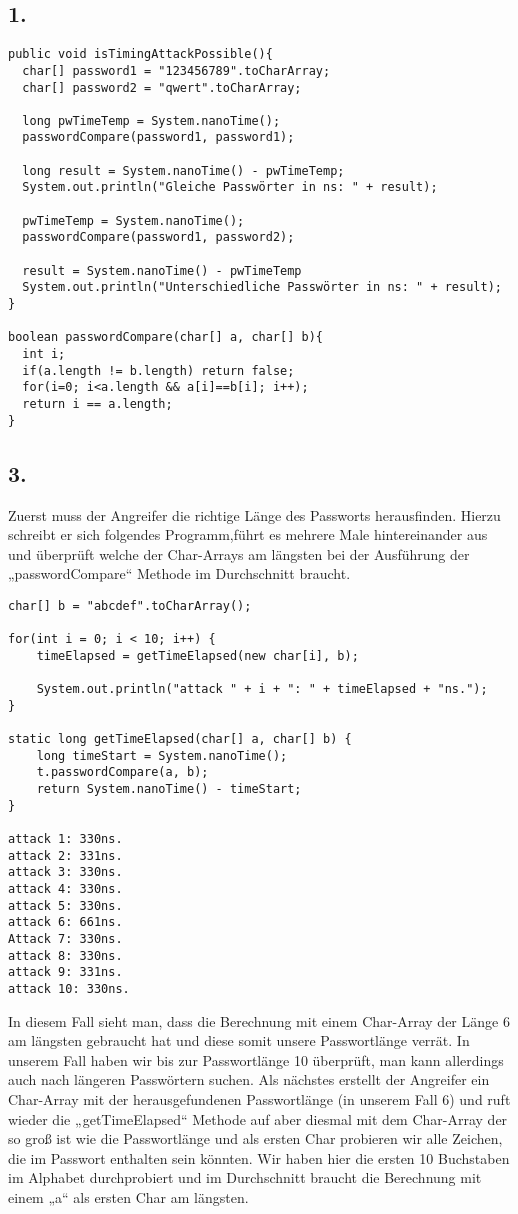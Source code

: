 \documentclass[a4paper,11pt]{scrartcl}
\begin{document}
\subsection*{1.} 
\begin{verbatim}
public void isTimingAttackPossible(){
  char[] password1 = "123456789".toCharArray;
  char[] password2 = "qwert".toCharArray;

  long pwTimeTemp = System.nanoTime();
  passwordCompare(password1, password1);
  
  long result = System.nanoTime() - pwTimeTemp;
  System.out.println("Gleiche Passwörter in ns: " + result);

  pwTimeTemp = System.nanoTime();
  passwordCompare(password1, password2);
  
  result = System.nanoTime() - pwTimeTemp
  System.out.println("Unterschiedliche Passwörter in ns: " + result);
}

boolean passwordCompare(char[] a, char[] b){
  int i;
  if(a.length != b.length) return false;
  for(i=0; i<a.length && a[i]==b[i]; i++);
  return i == a.length;
}
\end{verbatim}

\subsection*{3.}
Zuerst muss der Angreifer die richtige Länge des Passworts herausfinden. Hierzu schreibt er sich folgendes Programm,führt es mehrere Male hintereinander aus und überprüft welche der Char-Arrays am längsten bei der Ausführung der „passwordCompare“ Methode im Durchschnitt braucht.

\begin{verbatim}
char[] b = "abcdef".toCharArray();

for(int i = 0; i < 10; i++) {
	timeElapsed = getTimeElapsed(new char[i], b);
			
	System.out.println("attack " + i + ": " + timeElapsed + "ns.");
}

static long getTimeElapsed(char[] a, char[] b) {
	long timeStart = System.nanoTime();
	t.passwordCompare(a, b);
	return System.nanoTime() - timeStart;
}

attack 1: 330ns.
attack 2: 331ns.
attack 3: 330ns.
attack 4: 330ns.
attack 5: 330ns.
attack 6: 661ns.
Attack 7: 330ns.
attack 8: 330ns.
attack 9: 331ns.
attack 10: 330ns.
\end{verbatim}

In diesem Fall sieht man, dass die Berechnung mit einem Char-Array der Länge 6 am längsten gebraucht hat und diese somit unsere Passwortlänge verrät. In unserem Fall haben wir bis zur Passwortlänge 10 überprüft, man kann allerdings auch nach längeren Passwörtern suchen.
Als nächstes erstellt der Angreifer ein Char-Array mit der herausgefundenen Passwortlänge (in unserem Fall 6) und ruft wieder die „getTimeElapsed“ Methode auf aber diesmal mit dem Char-Array der so groß ist wie die Passwortlänge und als ersten Char probieren wir alle Zeichen, die im Passwort enthalten sein könnten. Wir haben hier die ersten 10 Buchstaben im Alphabet durchprobiert und im Durchschnitt braucht die Berechnung mit einem „a“ als ersten Char am längsten.
\end{document}
